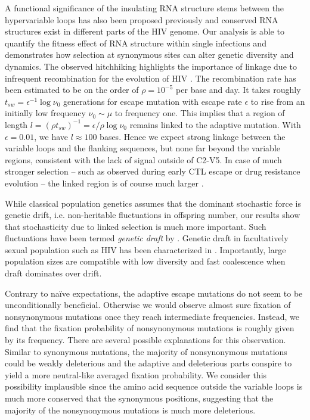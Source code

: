 \documentclass[rmp, twocolumn]{revtex4}
\newcommand{\shankaregion}{C2-V5}
\begin{document}
A functional significance of the insulating RNA structure stems between the
hypervariable loops has also been proposed previously
\citep{watts_architecture_2009, sanjuan_interplay_2011} and conserved RNA
structures exist in different parts of the HIV genome. Our analysis is able to
quantify the fitness effect of RNA structure within single infections and
demonstrates how selection at synonymous sites can alter genetic diversity and
dynamics. The observed hitchhiking highlights the importance of linkage due to
infrequent recombination for the evolution of HIV
\citep{neher_recombination_2010, batorsky_estimate_2011,
josefsson_majority_2011}. The recombination rate has been estimated to be on the
order of $\rho = 10^{-5}$ per base and day. It takes roughly $t_{sw} =
\epsilon^{-1} \log \nu_0$ generations for escape mutation with escape rate
$\epsilon$ to rise from an initially low frequency $\nu_0\sim \mu$ to frequency
one. This implies that a region of length $l = (\rho t_{sw})^{-1} = \epsilon /
\rho \log \nu_0$ remains linked to the adaptive mutation. With $\epsilon=0.01$,
we have $l\approx 100$ bases. Hence we expect strong linkage between the
variable loops and the flanking sequences, but none far beyond the variable
regions, consistent with the lack of signal outside of \shankaregion. In case of
much stronger selection -- such as observed during early CTL escape or drug
resistance evolution -- the linked region is of course much larger
\citep{nijhuis_stochastic_1998}. 

While classical population genetics assumes that the dominant stochastic force
is genetic drift, i.e. non-heritable fluctuations in offspring number, our
results show that stochasticity due to linked selection is much more important.
Such fluctuations have been termed \emph{genetic draft} by
\citet{gillespie_genetic_2000}. Genetic draft in facultatively sexual population
such as HIV has been characterized in \citep{neher_genetic_2011}. Importantly,
large population sizes are compatible with low diversity and fast coalescence
when draft dominates over drift.

Contrary to na\"ive expectations, the adaptive escape mutations do not seem to
be unconditionally beneficial. Otherwise we would observe almost sure fixation
of nonsynonymous mutations once they reach intermediate frequencies. Instead, we
find that the fixation probability of nonsynonymous mutations is roughly given
by its frequency. There are several possible explanations for this observation.
Similar to synonymous mutations, the majority of nonsynonymous mutations could
be weakly deleterious and the adaptive and deleterious parts conspire to yield a
more neutral-like averaged fixation probability. We consider this possibility
implausible since the amino acid sequence outside the variable loops is much
more conserved that the synonymous positions, suggesting that the majority of
the nonsynonymous mutations is much more deleterious. 
\end{document}
